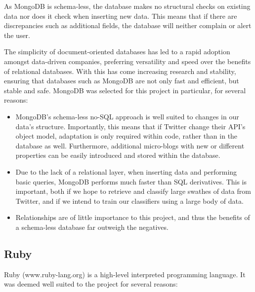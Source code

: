 As MongoDB is schema-less, the database makes no structural checks on existing data nor does it check when inserting new data. This means that if there are discrepancies such as additional fields, the database will neither complain or alert the user. 

The simplicity of document-oriented databases has led to a rapid adoption amongst data-driven companies\cite{popescu, moore}, preferring versatility and speed over the benefits of relational databases. With this has come increasing research and stability, ensuring that databases such as MongoDB are not only fast and efficient, but stable and safe. MongoDB was selected for this project in particular, for several reasons:

\begin{itemize}
	\item MongoDB's schema-less no-SQL approach is well suited to changes in our data's structure. Importantly, this means that if Twitter change their API's object model, adaptation is only required within code, rather than in the database as well. Furthermore, additional micro-blogs with new or different properties can be easily introduced and stored within the database.
	\item Due to the lack of a relational layer, when inserting data and performing basic queries, MongoDB performs much faster than SQL derivatives\cite{kennedy}. This is important, both if we hope to retrieve and classify large swathes of data from Twitter, and if we intend to train our classifiers using a large body of data.
	\item Relationships are of little importance to this project, and thus the benefits of a schema-less database far outweigh the negatives.
\end{itemize}

\subsection{Ruby}

Ruby (www.ruby-lang.org) is a high-level interpreted programming language. It was deemed well suited to the project for several reasons:

